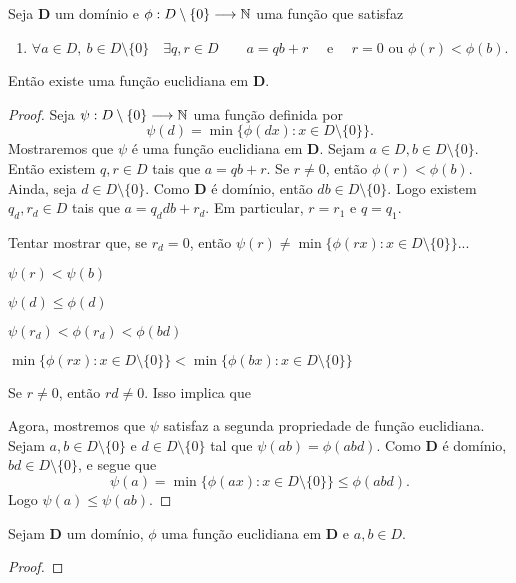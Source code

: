 \begin{prop}
	Seja $\bm D$ um domínio e $\phi: D \setminus \{0\} \longrightarrow \mathbb{N}$ uma função que satisfaz
	\begin{enumerate}
	\item $\forall a \in D,\ b \in D \setminus \{0\} \quad \exists q,r \in D \qquad a=qb+r \quad \text{\ \ e\ \ }\quad r=0 \text{\ \ ou\ \ } \phi(r)<\phi(b)$.
	\end{enumerate}
	Então existe uma função euclidiana em $\bm D$.
\end{prop}
\begin{proof}
	Seja $\psi: D \setminus \{0\} \longrightarrow \mathbb{N}$ uma função definida por
	\begin{equation*}
	\psi(d)=\min\{\phi(dx) : x \in D \setminus \{0\}\}.
	\end{equation*}
Mostraremos que $\psi$ é uma função euclidiana em $\bm D$. Sejam $a \in D,b \in D \setminus \{0\}$. Então existem $q,r \in D$ tais que $a=qb+r$. Se $r \neq 0$, então $\phi(r) < \phi(b)$. Ainda, seja $d \in D \setminus \{0\}$.  Como $\bm D$ é domínio, então $db \in D \setminus \{0\}$. Logo existem $q_d,r_d \in D$ tais que $a=q_ddb+r_d$. Em particular, $r=r_1$ e $q=q_1$.

	Tentar mostrar que, se $r_d = 0$, então $\psi(r) \neq \min\{\phi(rx) : x \in D \setminus \{0\}\}$...

	$\psi(r) < \psi(b)$

	$\psi(d) \leq \phi(d)$

	$\psi(r_d) < \phi(r_d) < \phi(bd)$

	$\min\{\phi(rx) : x \in D \setminus \{0\}\} < \min\{\phi(bx) : x \in D \setminus \{0\}\}$

	Se $r \neq 0$, então $rd \neq 0$. Isso implica que

	Agora, mostremos que $\psi$ satisfaz a segunda propriedade de função euclidiana. Sejam $a,b \in D \setminus \{0\}$ e $d \in D \setminus \{0\}$ tal que $\psi(ab)=\phi(abd)$. Como $\bm D$ é domínio, $bd \in D \setminus \{0\}$, e segue que
	\begin{equation*}
	\psi(a) =  \min\{\phi(ax) : x \in D \setminus \{0\}\} \leq \phi(abd).
	\end{equation*}
Logo $\psi(a) \leq \psi(ab)$.

\end{proof}

\begin{prop}
	Sejam $\bm D$ um domínio, $\phi$ uma função euclidiana em $\bm D$ e $a,b \in D$.
\end{prop}
\begin{proof}

\end{proof}

